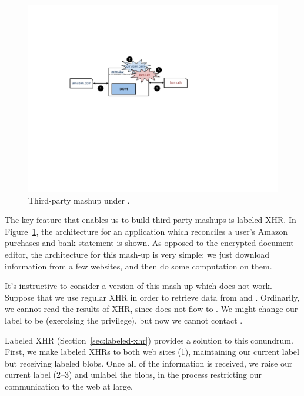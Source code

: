 \begin{figure}
\centerline{\includegraphics[width=\columnwidth]{mashup}}
\caption{\label{fig:mashup} Third-party mashup under \sys{}.}
\end{figure}
The key feature that enables us to build third-party mashups is
labeled XHR\@.  In Figure~\ref{fig:mashup}, the architecture for an
application which reconciles a user's Amazon purchases
and bank statement is shown.  As opposed to the encrypted document editor,
the architecture for this mash-up is very simple: we just download
information from a few websites, and then do some computation on them.

It's instructive to consider a version of this mash-up which does not
work.  Suppose that we use regular XHR in order to retrieve data from
 and .  Ordinarily, we cannot read
the results of XHR, since  does not flow to .
We might change our label to be  (exercising the 
privilege), but now we cannot contact .

Labeled XHR (Section~\ref{sec:labeled-xhr}) provides a solution to
this conundrum.  First, we make labeled XHRs to both web sites (1),
maintaining our current label but receiving labeled blobs.  Once all of
the information is received, we raise our current label (2--3) and
unlabel the blobs, in the process restricting our communication to the
web at large.


